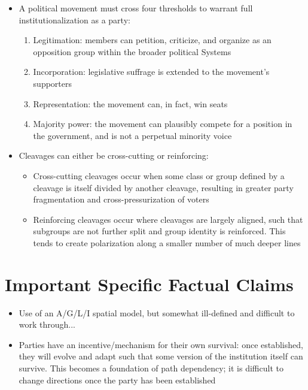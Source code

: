 \documentclass[12pt]{article}
\begin{document}
\begin{itemize}[leftmargin=*, itemsep=4pt]
\begin{enumerate}
        \item Organizational expression: groups, parties, institutions, etc. which mobilize and represent the division (this is the difference between cleavages and plain social difference)
    \end{enumerate}
    \item A political movement must cross four thresholds to warrant full institutionalization as a party:
    \begin{enumerate}
        \item Legitimation: members can petition, criticize, and organize as an opposition group within the broader political Systems
        \item Incorporation: legislative suffrage is extended to the movement's supporters
        \item Representation: the movement can, in fact, win seats
        \item Majority power: the movement can plausibly compete for a position in the government, and is not a perpetual minority voice
    \end{enumerate}
    \item Cleavages can either be cross-cutting or reinforcing:
    \begin{itemize}
        \item Cross-cutting cleavages occur when some class or group defined by a cleavage is itself divided by another cleavage, resulting in greater party fragmentation and cross-pressurization of voters
        \item Reinforcing cleavages occur where cleavages are largely aligned, such that subgroups are not further split and group identity is reinforced. This tends to create polarization along a smaller number of much deeper lines
    \end{itemize}
\end{itemize}


\section{Important Specific Factual Claims}

\begin{itemize}[leftmargin=*, itemsep=4pt]
    \item Use of an A/G/L/I spatial model, but somewhat ill-defined and difficult to work through...
    \item Parties have an incentive/mechanism for their own survival: once established, they will evolve and adapt such that some version of the institution itself can survive. This becomes a foundation of path dependency; it is difficult to change directions once the party has been established
\end{itemize}
\end{document}

